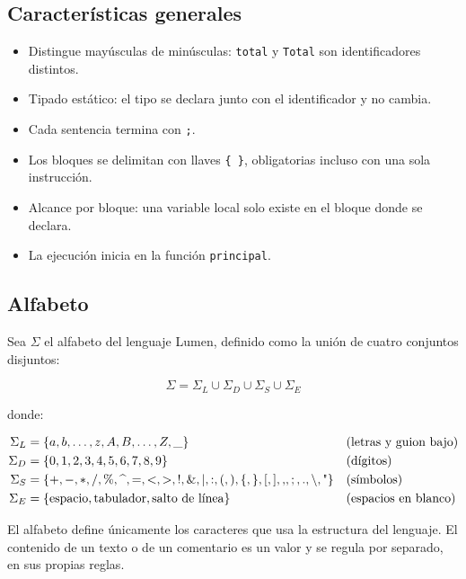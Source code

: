 \documentclass[spanish,11pt,letterpaper]{article}
\begin{document}
	\subsection{Caracter\'isticas generales}
	\begin{itemize}
		\item  Distingue may\'usculas de min\'usculas: \texttt{total} y \texttt{Total} son identificadores distintos.
		\item Tipado est\'atico: el tipo se declara junto con el identificador y no cambia.
		\item Cada sentencia termina con \texttt{;}.
		\item Los bloques se delimitan con llaves \texttt{\{ \}}, obligatorias incluso con una sola instrucci\'on.
		\item Alcance por bloque: una variable local solo existe en el bloque donde se declara.
		\item La ejecuci\'on inicia en la funci\'on \texttt{principal}.
	\end{itemize}
	
	\subsection{Alfabeto}
	Sea $\Sigma$ el alfabeto del lenguaje Lumen, definido como la uni\'on de cuatro
	conjuntos disjuntos:
	
	\[
	\Sigma = \Sigma_{L} \cup \Sigma_{D} \cup \Sigma_{S} \cup \Sigma_{E}
	\]
	
	donde:
	
	\begin{align*}
		\Sigma_{L} &= \{a, b, \dots, z, A, B, \dots, Z, \_\}
		&& \text{(letras y guion bajo)} \\
		\Sigma_{D} &= \{0, 1, 2, 3, 4, 5, 6, 7, 8, 9\}
		&& \text{(d\'igitos)} \\
		\Sigma_{S} &= \{+, -, *, /, \%, \text{\textasciicircum}, =, <, >, !, \&, |, :,
		(, ), \{, \}, [, ], \text{,}, ;, ., \backslash, \text{\textquotedbl}\}
		&& \text{(s\'imbolos)} \\
		\Sigma_{E} &= \{\text{espacio}, \text{tabulador}, \text{salto de l\'inea}\}
		&& \text{(espacios en blanco)}
	\end{align*}
	
	El alfabeto define \'unicamente los caracteres que usa la estructura del
	lenguaje. El contenido de un texto o de un comentario es un valor y se
	regula por separado, en sus propias reglas.
	
	\newpage
	
\end{document}
